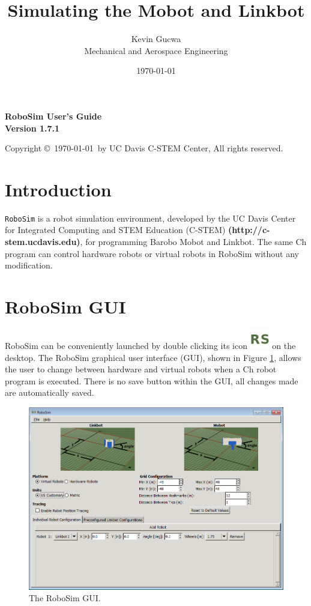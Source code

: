 \documentclass{article}
\title{Simulating the Mobot and Linkbot}
\author{Kevin Gucwa\\Mechanical and Aerospace Engineering}
\date{\today}
\begin{document}
\begin{center}
{\Huge\sf\bf RoboSim User's Guide}\\
\vspace*{2.5cm}
{\Large\bf Version 1.7.1}
\vspace{4in}

Copyright \copyright\ \today\ by UC Davis C-STEM Center, All rights reserved.

\end{center}

\newpage
\tableofcontents
\newpage

\section{Introduction}
\texttt{RoboSim} is a robot simulation environment, developed by the UC Davis
Center for Integrated Computing and STEM Education (C-STEM) {\color{blue} \bf
(http://c-stem.ucdavis.edu)}, for programming Barobo Mobot and Linkbot.  The
same Ch program  can control hardware robots or virtual robots in RoboSim
without any modification.

\section{RoboSim GUI}
\label{sec:gui}
RoboSim can be conveniently launched by double clicking its icon
\includegraphics[height=24pt]{images/robosim} on the desktop.  The RoboSim
graphical user interface (GUI), shown in Figure \ref{fig:gui}, allows the user
to change between hardware and virtual robots when a Ch robot program is
executed.  There is no save button within the GUI, all changes made are
automatically saved.
\begin{figure}[H]
	\begin{center}
		\includegraphics[width=6in]{images/gui}
	\end{center}
	\caption{The RoboSim GUI.}
	\label{fig:gui}
\end{figure}
\end{document}
